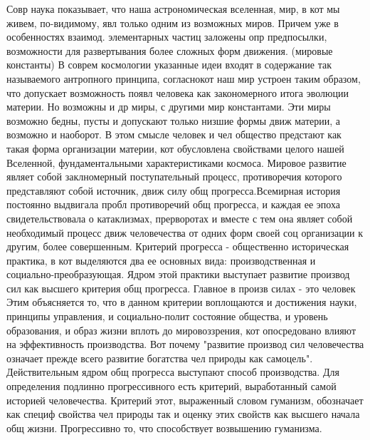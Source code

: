 \documentclass[12pt]{article}
\begin{document}
Совр наука показывает, что наша астрономическая вселенная, мир, в кот мы живем, по-видимому, явл только
одним из возможных миров. Причем уже в особенностях взаимод. элементарных частиц заложены опр
предпосылки, возможности для развертывания более сложных форм движения. (мировые константы)
В соврем космологии указанные идеи входят в содержание так называемого антропного принципа, согласнокот
наш мир устроен таким образом, что допускает возможность появл человека как закономерного итога эволюции
материи. Но возможны и др миры, с другими мир константами. Эти миры возможно бедны, пусты и допускают
только низшие формы движ материи, а возможно и наоборот. В этом смысле человек и чел общество предстают
как такая форма организации материи, кот обусловлена свойствами целого нашей Вселенной,
фундаментальными характеристиками космоса. 
Мировое развитие являет собой заклномерный поступательный процесс, противоречия которого представляют
собой источник, движ силу общ прогресса.Всемирная история постоянно выдвигала пробл противоречий общ
прогресса, и каждая ее эпоха свидетельствовала о катаклизмах, прерворотах и вместе с тем она являет собой
необходимый процесс движ человечества от одних форм своей соц организации к другим, более совершенным. 
Критерий прогресса - общественно историческая практика, в кот выделяются два ее основных вида:
производственная и социально-преобразующая. Ядром этой практики выступает развитие производ сил как
высшего критерия общ прогресса. Главное в произв силах - это человек Этим объясняется то, что в данном
критерии воплощаются и достижения науки, принципы управления, и социально-полит состояние общества, и
уровень образования, и образ жизни вплоть до мировоззрения, кот опосредовано влияют на эффективность
производства. Вот почему "развитие производ сил человечества означает прежде всего развитие богатства чел
природы как самоцель". Действительным ядром общ прогресса выступают способ производства.
Для определения подлинно прогрессивного есть критерий, выработанный самой историей человечества.
Критерий этот, выраженный словом гуманизм, обозначает как специф свойства чел природы так и оценку этих
свойств как высшего начала общ жизни. Прогрессивно то, что способствует возвышению гуманизма.
\end{document}
